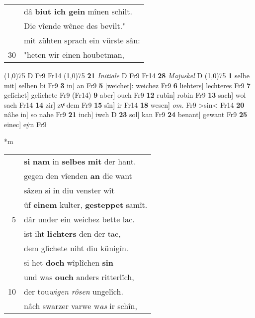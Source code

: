 \documentclass[8pt,a4paper,notitlepage]{article}
\begin{document}
\begin{table}[ht]
\begin{minipage}[t]{0.5\linewidth}
\begin{tabular}{rl}
 & dâ \textbf{biut ich gein} mînen schilt.\\ 
 & Die vîende wênec des bevilt."\\ 
 & mit zühten sprach ein vürste sân:\\ 
30 & "heten wir einen houbetman,\\ 
\end{tabular}
\scriptsize
\line(1,0){75} \newline
D Fr9 Fr14 \newline
\line(1,0){75} \newline
\textbf{21} \textit{Initiale} D Fr9 Fr14  \textbf{28} \textit{Majuskel} D  \newline
\line(1,0){75} \newline
\textbf{1} selbe mit] selben bi Fr9 \textbf{3} in] an Fr9 \textbf{5} [weichet]: weichez Fr9 \textbf{6} liehters] lechteres Fr9 \textbf{7} gelîchet] gelichete Fr9 (Fr14) \textbf{9} aber] ouch Fr9 \textbf{12} rubîn] robin Fr9 \textbf{13} sach] wol sach Fr14 \textbf{14} zir] zvͦ dem Fr9 \textbf{15} sîn] ir Fr14 \textbf{18} wesen] \textit{om.} Fr9 >sin< Fr14 \textbf{20} nâhe in] so nahe Fr9 \textbf{21} iuch] iwch D \textbf{23} sol] kan Fr9 \textbf{24} benant] gewant Fr9 \textbf{25} einec] eẏn Fr9 \newline
\end{minipage}
\hspace{0.5cm}
\begin{minipage}[t]{0.5\linewidth}
\small
\begin{center}*m
\end{center}
\begin{tabular}{rl}
 & \textbf{si} \textbf{nam} in \textbf{selbes} \textbf{mit} der hant.\\ 
 & gegen den vîenden \textbf{an} die want\\ 
 & sâzen si in diu venster wît\\ 
 & ûf \textbf{einem} kulter, \textbf{gesteppet} samît.\\ 
5 & dâr under ein weichez bette lac.\\ 
 & ist iht \textbf{li\textit{e}hters} den der tac,\\ 
 & dem glîchete niht diu künigîn.\\ 
 & si het \textbf{doch} wîplîchen \textbf{sin}\\ 
 & und was \textbf{ouch} anders ritterlîch,\\ 
10 & der tou\textit{wigen rôsen} ungelîch.\\ 
 & nâch swarzer varwe w\textit{as} ir schîn,\\ 

\end{tabular}
\end{minipage}
\end{table}
\end{document}
